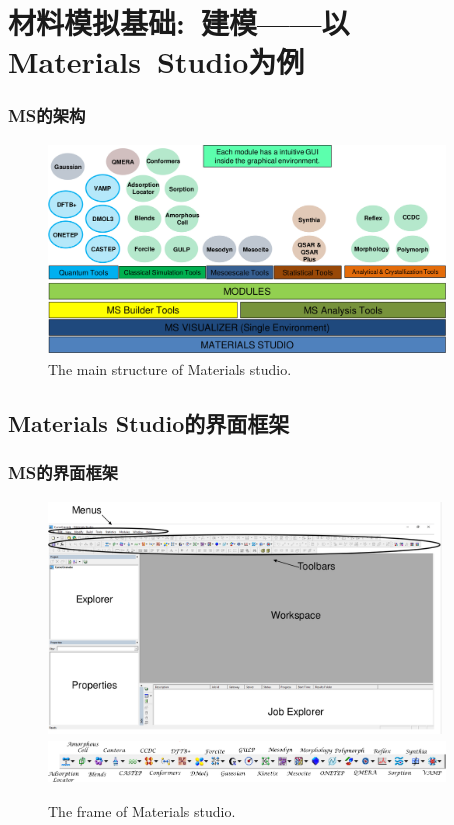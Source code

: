 \section{材料模拟基础:~建模——以\rm{Materials~Studio}为例}
\frame
{
	\frametitle{\textrm{MS}的架构}
\begin{figure}[h!]
\centering
\vspace*{-0.10in}
\includegraphics[height=2.20in,width=4.15in,viewport=0 0 1275 667,clip]{Figures/MS-main_Struct.png}
\caption{\tiny \textrm{The main structure of Materials studio.}}%
\label{MS-main-structure}
\end{figure}
}

\subsection{\rm{Materials Studio}的界面框架}
\frame
{
	\frametitle{\textrm{MS}的界面框架}
\begin{figure}[h!]
\centering
\vspace*{-0.31in}
\includegraphics[height=2.45in,width=4.10in,viewport=0 0 1340 800,clip]{Figures/MS-Frame.png}
\includegraphics[height=0.45in,width=4.15in,viewport=0 0 1400 147,clip]{Figures/MS-Frame_calculators.png}
\caption{\tiny \textrm{The frame of Materials studio.}}%
\label{MS-Frame}
\end{figure}
}


